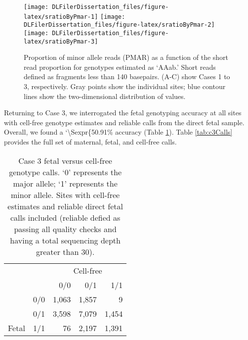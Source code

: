\documentclass[11pt,letterpaper]{book}
\begin{document}
\begin{figure}

{\centering \texttt{[image: DLFilerDissertation\_files/figure-latex/sratioByPmar-1]} \texttt{[image: DLFilerDissertation\_files/figure-latex/sratioByPmar-2]} \texttt{[image: DLFilerDissertation\_files/figure-latex/sratioByPmar-3]} 

}

\caption[Relationship between PMAR and fraction of reads \textless140 basepairs.]{Proportion of minor allele reads (PMAR) as a function of the short read proportion for genotypes estimated as `AAab.' Short reads defined as fragments less than 140 basepairs. (A-C) show Cases 1 to 3, respectively. Gray points show the individual sites; blue contour lines show the two-dimensional distribution of values.}\label{fig:sratioByPmar}
\end{figure}

Returning to Case 3, we interrogated the fetal genotyping accuracy at all sites with cell-free genotype estimates and reliable calls from the direct fetal sample.
Overall, we found a `\textbackslash Sexpr\{50.91\% accuracy (Table \ref{tab:c3FetByCf}).
Table \ref{tab:c3Calls} provides the full set of maternal, fetal, and cell-free calls.





\begin{table}

\caption[Case 3 fetal versus cell-free genotype calls.]{\label{tab:c3FetByCf}Case 3 fetal versus cell-free genotype calls. `0' represents the major allele; `1' represents the minor allele. Sites with cell-free estimates and reliable direct fetal calls included (reliable defied as passing all quality checks and having a total sequencing depth greater than 30).}
\centering
\begin{tabular}[t]{llrrr}
\toprule
\multicolumn{2}{c}{ } & \multicolumn{3}{c}{Cell-free} \\
\cmidrule(l{3pt}r{3pt}){3-5}
  &   & 0/0 & 0/1 & 1/1\\
\midrule
 & 0/0 & 1,063 & 1,857 & 9\\
\cmidrule{2-5}
 & 0/1 & 3,598 & 7,079 & 1,454\\
\cmidrule{2-5}
\multirow{-3}{*}{\raggedright\arraybackslash Fetal} & 1/1 & 76 & 2,197 & 1,391\\
\bottomrule
\end{tabular}
\end{table}
\end{document}
